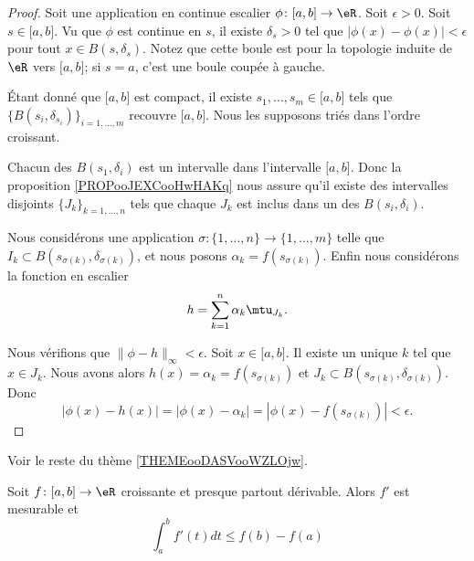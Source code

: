 \begin{proof}
	Soit une application en continue escalier \(\phi \colon \mathopen[ a,b\mathclose]\to \eR  \). Soit \( \epsilon>0\). Soit \( s\in \mathopen[ a,b\mathclose]\). Vu que \( \phi\) est continue en \( s\), il existe \( \delta_s>0\) tel que \( | \phi(x)-\phi(x) |<\epsilon\) pour tout \( x\in B(s,\delta_s)\). Notez que cette boule est pour la topologie induite de \( \eR\) vers \( \mathopen[ a,b\mathclose]\); si \( s=a\), c'est une boule coupée à gauche.

	Étant donné que \( \mathopen[ a,b\mathclose]\) est compact, il existe \( s_1,\ldots,s_m\in \mathopen[ a,b\mathclose]\) tels que \( \{ B(s_i,\delta_{s_i}) \}_{i=1,\ldots,m}\) recouvre \( \mathopen[ a,b\mathclose]\). Nous les supposons triés dans l'ordre croissant.


	Chacun des \( B(s_1,\delta_i)\) est un intervalle dans l'intervalle \( \mathopen[ a,b\mathclose]\). Donc la proposition \ref{PROPooJEXCooHwHAKq} nous assure qu'il existe des intervalles disjoints \( \{ J_k \}_{k=1,\ldots,n}\) tels que chaque \( J_k\) est inclus dans un des \( B(s_i,\delta_i)\).

	Nous considérons une application \(\sigma \colon \{ 1,\ldots,n \}\to \{ 1,\ldots,m \}  \) telle que \( I_k\subset  B(s_{\sigma(k)}, \delta_{\sigma(k)})\), et nous posons \( \alpha_k=f(s_{\sigma(k)})\). Enfin nous considérons la fonction en escalier
	\begin{equation}
		h=\sum_{k=1}^n\alpha_k\mtu_{J_k}.
	\end{equation}

	Nous vérifions que \( \| \phi-h \|_{\infty}<\epsilon\). Soit \( x\in \mathopen[ a,b\mathclose]\). Il existe un unique \( k\) tel que \( x\in J_k\). Nous avons alors \( h(x)=\alpha_k=f(s_{\sigma(k)})\) et \( J_k\subset B(s_{\sigma(k)},\delta_{\sigma(k)})\). Donc
	\begin{equation}
		| \phi(x)-h(x) |=| \phi(x)-\alpha_k |=| \phi(x) -f(s_{\sigma(k)}) |<\epsilon.
	\end{equation}
\end{proof}

Voir le reste du thème \ref{THEMEooDASVooWZLOjw}.


\begin{proposition}	\label{PROPooWFSPooIBogJV}
	Soit \(f \colon \mathopen[ a,b\mathclose]\to \eR  \) croissante et presque partout dérivable. Alors \( f'\) est mesurable et
	\begin{equation}
		\int_a^bf'(t)dt\leq f(b)-f(a)
	\end{equation}
\end{proposition}



